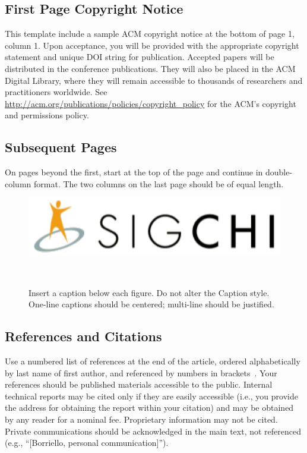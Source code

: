 \documentclass{sigchi}
\begin{document}
\subsection{First Page Copyright Notice}
This template include a sample ACM copyright notice at the bottom of
page 1, column 1.  Upon acceptance, you will be provided with the
appropriate copyright statement and unique DOI string for publication.
Accepted papers will be distributed in the conference
publications. They will also be placed in the ACM Digital Library,
where they will remain accessible to thousands of researchers and
practitioners worldwide. See
\url{http://acm.org/publications/policies/copyright_policy} for the
ACM's copyright and permissions policy.

\subsection{Subsequent Pages}

On pages beyond the first, start at the top of the page and continue
in double-column format.  The two columns on the last page should be
of equal length.

\begin{figure}
\centering
  \includegraphics[width=0.9\columnwidth]{figures/sigchi-logo}
  \caption{Insert a caption below each figure. Do not alter the
    Caption style.  One-line captions should be centered; multi-line
    should be justified. }~\label{fig:figure1}
\end{figure}

\subsection{References and Citations}

Use a numbered list of references at the end of the article, ordered
alphabetically by last name of first author, and referenced by numbers
in
brackets~\cite{acm_categories,ethics,Klemmer:2002:WSC:503376.503378}.
Your references should be published materials accessible to the
public. Internal technical reports may be cited only if they are
easily accessible (i.e., you provide the address for obtaining the
report within your citation) and may be obtained by any reader for a
nominal fee. Proprietary information may not be cited. Private
communications should be acknowledged in the main text, not referenced
(e.g., ``[Borriello, personal communication]'').
\end{document}
